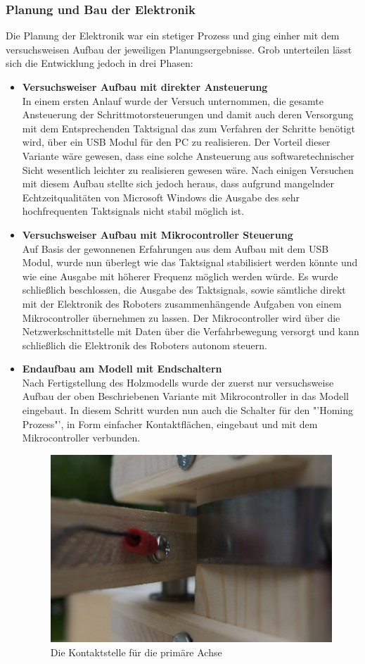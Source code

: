 \subsubsection{Planung und Bau der Elektronik}
Die Planung der Elektronik war ein stetiger Prozess und ging einher mit dem versuchsweisen Aufbau der jeweiligen Planungsergebnisse. Grob unterteilen lässt sich die Entwicklung jedoch in drei Phasen:
\begin{itemize}
\item \textbf{Versuchsweiser Aufbau mit direkter Ansteuerung}\\
In einem ersten Anlauf wurde der Versuch unternommen, die gesamte Ansteuerung der Schrittmotorsteuerungen und damit auch deren Versorgung mit dem Entsprechenden Taktsignal das zum Verfahren der Schritte benötigt wird, über ein USB Modul für den PC zu realisieren. Der Vorteil dieser Variante wäre gewesen, dass eine solche Ansteuerung aus softwaretechnischer Sicht wesentlich leichter zu realisieren gewesen wäre. Nach einigen Versuchen mit diesem Aufbau stellte sich jedoch heraus, dass aufgrund mangelnder Echtzeitqualitäten von Microsoft Windows die Ausgabe des sehr hochfrequenten Taktsignals nicht stabil möglich ist.
\item \textbf{Versuchsweiser Aufbau mit Mikrocontroller Steuerung}\\
Auf Basis der gewonnenen Erfahrungen aus dem Aufbau mit dem USB Modul, wurde nun überlegt wie das Taktsignal stabilisiert werden könnte und wie eine Ausgabe mit höherer Frequenz möglich werden würde. Es wurde schließlich beschlossen, die Ausgabe des Taktsignals, sowie sämtliche direkt mit der Elektronik des Roboters zusammenhängende Aufgaben von einem Mikrocontroller übernehmen zu lassen. Der Mikrocontroller wird über die Netzwerkschnittstelle mit Daten über die Verfahrbewegung versorgt und kann schließlich die Elektronik des Roboters autonom steuern.
\item \textbf{Endaufbau am Modell mit Endschaltern}\\
Nach Fertigstellung des Holzmodells wurde der zuerst nur versuchsweise Aufbau der oben Beschriebenen Variante mit Mikrocontroller in das Modell eingebaut. In diesem Schritt wurden nun auch die Schalter für den "'Homing Prozess"', in Form einfacher Kontaktflächen, eingebaut und mit dem Mikrocontroller verbunden.
\begin{figure}[H]
\centering
\includegraphics[width=11cm]{images/contact}
\caption{Die Kontaktstelle für die primäre Achse}
\end{figure}


\end{itemize}
